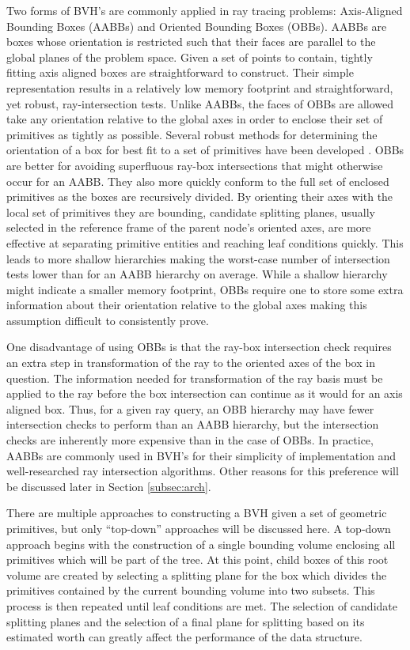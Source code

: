 Two forms of BVH's are commonly applied in ray tracing problems: Axis-Aligned
Bounding Boxes (AABBs) and Oriented Bounding Boxes (OBBs). AABBs are boxes whose
orientation is restricted such that their faces are parallel to the global
planes of the problem space. Given a set of points to contain, tightly fitting
axis aligned boxes are straightforward to construct. Their simple representation
results in a relatively low memory footprint and straightforward, yet robust,
ray-intersection tests. Unlike AABBs, the faces of OBBs are allowed take any
orientation relative to the global axes in order to enclose their set of
primitives as tightly as possible. Several robust methods for determining the
orientation of a box for best fit to a set of primitives have been developed
\cite{Gottschalk_1996,ORourke_1985}. OBBs are better for avoiding superfluous
ray-box intersections that might otherwise occur for an AABB. They also more
quickly conform to the full set of enclosed primitives as the boxes are
recursively divided. By orienting their axes with the local set of primitives
they are bounding, candidate splitting planes, usually selected in the reference
frame of the parent node's oriented axes, are more effective at separating
primitive entities and reaching leaf conditions quickly. This leads to more
shallow hierarchies making the worst-case number of intersection tests lower
than for an AABB hierarchy on average. While a shallow hierarchy might indicate
a smaller memory footprint, OBBs require one to store some extra information
about their orientation relative to the global axes making this assumption
difficult to consistently prove.

One disadvantage of using OBBs is that the ray-box intersection check requires
an extra step in transformation of the ray to the oriented axes of the box in
question. The information needed for transformation of the ray basis must be
applied to the ray before the box intersection can continue as it would for an
axis aligned box. Thus, for a given ray query, an OBB hierarchy may have fewer
intersection checks to perform than an AABB hierarchy, but the intersection
checks are inherently more expensive than in the case of OBBs. In practice,
AABBs are commonly used in BVH's for their simplicity of implementation and
well-researched ray intersection algorithms. Other reasons for this preference
will be discussed later in Section \ref{subsec:arch}.

There are multiple approaches to constructing a BVH given a set
of geometric primitives, but only ``top-down'' approaches will be discussed
here. A top-down approach begins with the construction of a single bounding
volume enclosing all primitives which will be part of the tree. At this point,
child boxes of this root volume are created by selecting a splitting plane for
the box which divides the primitives contained by the current bounding volume
into two subsets. This process is then repeated until leaf conditions are
met. The selection of candidate splitting planes and the selection of a final
plane for splitting based on its estimated worth can greatly affect the
performance of the data structure.

